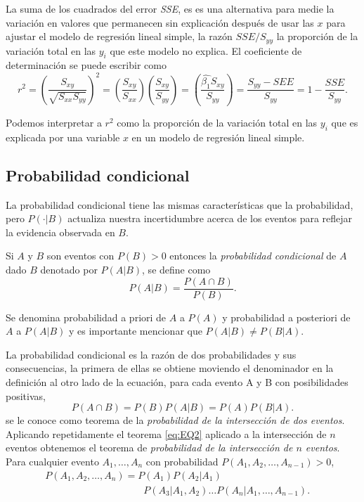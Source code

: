 \documentclass[12pt,letterpaper]{article}
\begin{document}
La suma de los cuadrados del error \emph{SSE}, es es una alternativa para medie la variación en valores que permanecen sin explicación después de usar las $x$ para ajustar el modelo de regresión lineal simple, la razón $SSE/S_{yy}$ la proporción de la variación total en las $y_i$ que este modelo no explica. El coeficiente de determinación se puede escribir como
\begin{equation}
r^2=(\frac{S_{xy}}{\sqrt{S_{xx}S_{yy}}})^2=(\frac{S_{xy}}{S_{xx}})(\frac{S_{xy}}{S_{yy}})=(\frac{\hat{\beta_1}S_{xy}}{S_{yy}})=\frac{S_{yy}-SEE}{S_{yy}}=1-\frac{SSE}{S_{yy}}.
\end{equation}



Podemos interpretar a $r^2$ como la proporción de la variación total en las $y_i$  que es explicada por una variable $x$ en un modelo de regresión lineal simple.

\newpage
\subsection {Probabilidad condicional}
La probabilidad condicional tiene las mismas características que la probabilidad, pero $P(\cdot|B)$ actualiza nuestra incertidumbre acerca de los eventos para reflejar la evidencia observada en $B$.

Si $A$ y $B$ son eventos con $P(B)>0$ entonces la \emph{probabilidad condicional} de $A$ dado $B$ denotado por $P(A|B)$, se define como
\begin{equation}
P(A|B)=\frac{P(A\cap B)}{P(B)}.
\end{equation}

Se denomina probabilidad a priori de $A$ a $P(A)$ y probabilidad a posteriori de $A$ a $P(A|B)$ y es importante mencionar que $P(A|B) \neq P(B|A)$.

La probabilidad condicional es la razón de dos probabilidades y sus consecuencias, la primera de ellas se obtiene moviendo el denominador en la definición al otro lado de la ecuación, para cada evento {A} y {B} con posibilidades positivas,
\begin{equation}\label{eq:EQ2}
P(A\cap B)=P(B)P(A|B)=P(A)P(B|A).
\end{equation}
se le conoce como teorema de la \emph{probabilidad de la intersección de dos eventos}. Aplicando repetidamente el teorema \eqref{eq:EQ2} aplicado a la intersección de $n$ eventos obtenemos el teorema de \emph{probabilidad de la intersección de $n$ eventos}. Para cualquier evento $A_1,\ldots,A_n$ con probabilidad $P(A_1,A_2,\ldots,A_{n-1})>0$,
\begin{equation}
\begin{matrix}
P(A_1,A_2,\ldots,A_n)=P(A_1)P(A_2|A_1) \qquad \qquad \qquad \qquad \qquad \\
\qquad  \qquad \qquad \qquad \qquad P(A_3|A_1,A_2)\ldots P(A_n|A_1,\ldots,A_{n-1}).\end{matrix}
\end{equation}
\end{document}
